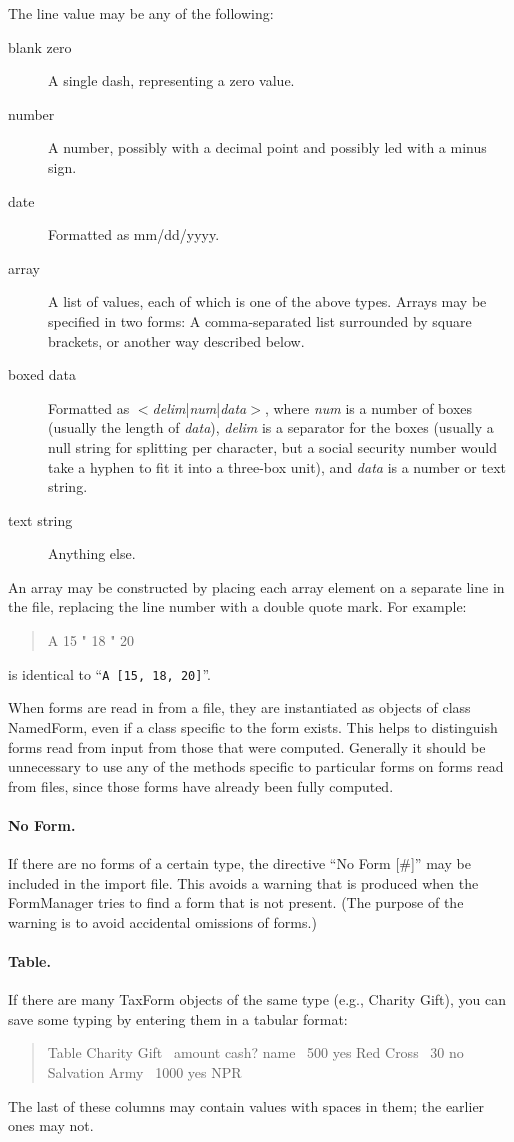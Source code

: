 \documentclass[12pt]{article}
\begin{document}
The line value may be any of the following:
\begin{description}
\item[blank zero] A single dash, representing a zero value.
\item[number] A number, possibly with a decimal point and possibly led with a
minus sign.
\item[date] Formatted as mm/dd/yyyy.
\item[array] A list of values, each of which is one of the above types. Arrays
may be specified in two forms: A comma-separated list surrounded by square
brackets, or another way described below.
\item[boxed data] Formatted as
$<$\emph{delim}|\emph{num}|\emph{data}$>$, where \emph{num} is a
number of boxes (usually the length of \emph{data}), \emph{delim} is a separator
for the boxes (usually a null string for splitting per character, but a social
security number would take a hyphen to fit it into a three-box unit), and
\emph{data} is a number or text string.
\item[text string] Anything else.
\end{description}

An array may be constructed by placing each array element on a separate line in
the file, replacing the line number with a double quote mark. For example:
\begin{quote}
\ttfamily\obeylines\obeyspaces
A   15
"   18
"   20
\end{quote}
is identical to ``\texttt{A [15, 18, 20]}''.

When forms are read in from a file, they are instantiated as objects of class
NamedForm, even if a class specific to the form exists. This helps to
distinguish forms read from input from those that were computed. Generally it
should be unnecessary to use any of the methods specific to particular forms on
forms read from files, since those forms have already been fully computed.

\paragraph{No Form.} If there are no forms of a certain type, the directive ``No
Form [\#]'' may be included in the import file. This avoids a warning that is
produced when the FormManager tries to find a form that is not present. (The
purpose of the warning is to avoid accidental omissions of forms.)

\paragraph{Table.} If there are many TaxForm objects of the same type (e.g.,
Charity Gift), you can save some typing by entering them in a tabular format:
\begin{quote}
\ttfamily\obeylines\frenchspacing\obeyspaces
Table Charity Gift
\    amount   cash?   name
\    500      yes     Red Cross
\    30       no      Salvation Army
\    1000     yes     NPR
\end{quote}
The last of these columns may contain values with spaces in them; the earlier
ones may not.
\end{document}
